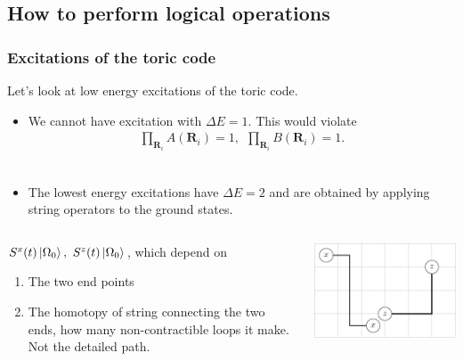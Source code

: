 \documentclass{beamer}
\renewcommand{\(}{\left(}
\renewcommand{\)}{\right)}
\renewcommand{\[}{\left[}
\renewcommand{\]}{\right]}
\begin{document}

\subsection{How to perform logical operations}

\begin{frame}
    \frametitle{Excitations of the toric code}
    Let's look at low energy excitations of the toric code. 
    \begin{itemize}
        \item We cannot have excitation with $\Delta E = 1$. This would violate 
        \begin{align*}
            \prod_{\bm R_i} A(\bm R_i) = 1, \ \ \prod_{\bm R_i} B(\bm R_i) = 1.
            \end{align*}\
        \item The lowest energy excitations have $\Delta E = 2$ and are obtained by applying string operators to the ground states. 
    \end{itemize}
    \pause
    \begin{center}
        \begin{columns}
            \begin{column}{0.5\textwidth}
                $S^x(t)\ket{\Omega_0},\  S^z(t)\ket{\Omega_0}$,
                which depend on
                \begin{enumerate}
                    \item The two end points
                    \item The homotopy of string connecting the two ends, how many non-contractible loops it make. Not the detailed path. 
                \end{enumerate}
            \end{column}
            \begin{column}{0.5\textwidth}
                \centering
                \includegraphics[scale = 0.8]{two_strings.pdf}
            \end{column}
        \end{columns}
    \end{center}
\end{frame}
\end{document}
